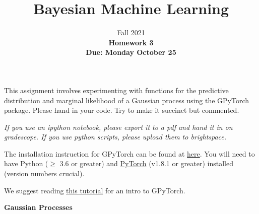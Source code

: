 \documentclass[11pt]{article}
\title{\vspace{-20mm} Bayesian Machine Learning}
\date{}
\author{Fall 2021 \\
\vspace{2mm}
\textbf{Homework 3}  \\ \textbf{Due: Monday October 25}}
\begin{document}
\maketitle

This assignment involves experimenting with functions for the predictive distribution and 
marginal likelihood of a Gaussian process using the GPyTorch package.  Please 
hand in your code. Try to make it succinct but commented.

\textit{If you use an ipython notebook, please export it to a pdf and hand it in on gradescope. If you use python scripts, please upload them to brightspace.}

The installation instruction for GPyTorch can be found at 
\href{https://github.com/cornellius-gp/gpytorch}{here}. 
You will need to have Python ($\geq$ 3.6 or greater) and \href{https://pytorch.org/}{PyTorch} (v1.8.1 or greater) installed (version numbers crucial).

We suggest reading 
\href{https://gpytorch.readthedocs.io/en/latest/examples/01_Simple_GP_Regression/Simple_GP_Regression.html}{this tutorial}
for an intro to GPyTorch.

\textbf{Gaussian Processes}
\end{document}
